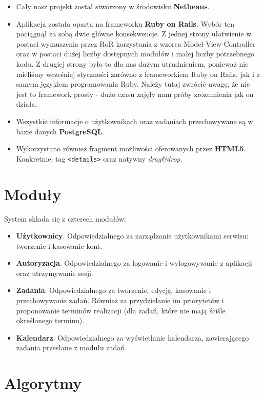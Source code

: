 \documentclass[pdflatex,11pt]{aghdpl}
\begin{document}
\begin{itemize}
\item Cały nasz projekt został stworzony w środowisku \textbf{Netbeans}.
\item Aplikacja została oparta na frameworku \textbf{Ruby on Rails}. Wybór ten pociągnął za sobą dwie główne konsekwencje. Z jednej strony ułatwienie w postaci wymuszenia przez RoR korzystania z wzorca Model-View-Controller oraz w postaci dużej liczby dostępnych modułów i małej liczby potrzebnego kodu. Z drugiej strony było to dla nas dużym utrudnieniem, ponieważ nie mieliśmy wcześniej styczności zarówno z frameworkiem Ruby on Rails, jak i z samym językiem programowania Ruby. Należy tutaj zwrócić uwagę, że nie jest to framework prosty - dużo czasu zajęły nam próby zrozumienia jak on działa.
\item Wszystkie informacje o użytkownikach oraz zadaniach przechowywane są w bazie danych \textbf{PostgreSQL}.
\item Wykorzystano również fragment możliwości oferowanych przez \textbf{HTML5}. Konkretnie: tag \texttt{<details>} oraz natywny \textit{drag\&drop}.
\end{itemize}


\section{Moduły}

System składa się z czterech modułów:

\begin{itemize}
\item \textbf{Użytkownicy}. Odpowiedzialnego za zarządzanie użytkownikami serwisu: tworzenie i kasowanie kont.
\item \textbf{Autoryzacja}. Odpowiedzialnego za logowanie i wylogowywanie z aplikacji oraz utrzymywanie sesji.
\item \textbf{Zadania}. Odpowiedzialnego za tworzenie, edycję, kasowanie i przechowywanie zadań. Również za przydzielanie im priorytetów i proponowanie terminów realizacji (dla zadań, które nie mają ściśle określonego terminu).
\item \textbf{Kalendarz}. Odpowiedzialnego za wyświetlanie kalendarza, zawierającego zadania przesłane z modułu zadań.
\end{itemize}


\section{Algorytmy}
\end{document}
